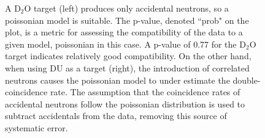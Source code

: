 \begin{figure}[htbp]
    \centering
    \caption{A D$_2$O target (left) produces only accidental neutrons, so a poissonian model is suitable.
    The p-value, denoted ``prob" on the plot, is a metric for assessing the compatibility of the data to a given model, poissonian in this case.
    A p-value of 0.77 for the D$_2$O target indicates relatively good compatibility.
    On the other hand, when using DU as a target (right), the introduction of correlated neutrons causes the poissonian model to under estimate the double-coincidence rate.
    The assumption that the coincidence rates of accidental neutrons follow the poissonian distribution is used to subtract accidentals from the data, removing this source of systematic error.}
    \label{fig:PoissonianFits}
\end{figure}

